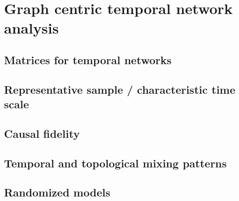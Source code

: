 \section{Graph centric temporal network analysis}\label{sec:PRL}

\subsection{Matrices for temporal networks}

\subsection{Representative sample / characteristic time scale}

\subsection{Causal fidelity}

\subsection{Temporal and topological mixing patterns}

\subsection{Randomized models}\label{sec:randomized_models_tvg}





